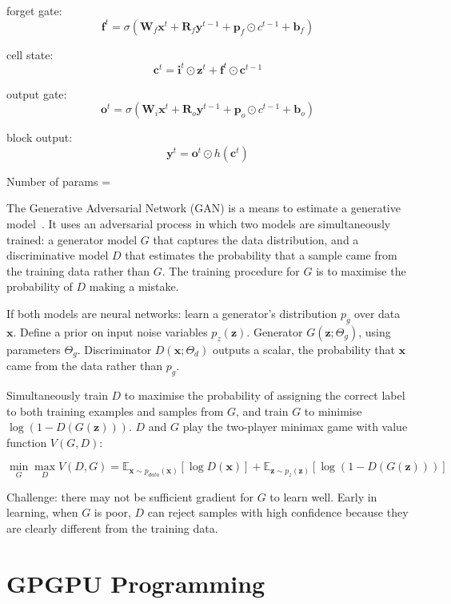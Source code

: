 forget gate:
\[ \bm{f}^{t} = \sigma \left( \bm{W}_f \bm{x}^t + \bm{R}_f \bm{y}^{t-1} + \bm{p}_f \odot c^{t-1} + \bm{b}_f \right) \]

cell state:
\[ \bm{c}^t = \bm{i}^t \odot \bm{z}^t + \bm{f}^t \odot \bm{c}^{t-1} \]

output gate:
\[ \bm{o}^{t} = \sigma \left( \bm{W}_i \bm{x}^t + \bm{R}_o \bm{y}^{t - 1} + \bm{p}_o \odot c^{t-1} + \bm{b}_o \right) \]

block output:
\[ \bm{y}^t = \bm{o}^t \odot h(\bm{c}^t) \]

Number of params = \todo[inline]{\ldots}



The Generative Adversarial Network (GAN) is a means to estimate a generative model~\cite{Goodfellow2014}. It uses an adversarial process in which two models are simultaneously trained: a generator model $G$ that captures the data distribution, and a discriminative model $D$ that estimates the probability that a sample came from the training data rather than $G$. The training procedure for $G$ is to maximise the probability of $D$ making a mistake.

If both models are neural networks: learn a generator's distribution $p_g$ over data $\bm{x}$. Define a prior on input noise variables $p_z(\bm{z})$. Generator $G(\bm{z}; \Theta_g)$, using parameters $\Theta_g$. Discriminator $D(\bm{x}; \Theta_d)$ outputs a scalar, the probability that $\bm{x}$ came from the data rather than $p_g$.

Simultaneously train $D$ to maximise the probability of assigning the correct label to both training examples and samples from $G$, and train $G$ to minimise $\log (1 - D(G(\bm{z})))$. $D$ and $G$ play the two-player minimax game with value function $V(G, D)$:

\[ \min_G \max_D V(D, G) = \mathbb{E}_{\bm{x} \sim  p_{data}(\bm{x})} [ \log D(\bm{x}) ] + \mathbb{E}_{\bm{z} \sim p_z(\bm{z})} [ \log (1 - D(G(\bm{z}))) ] \]

Challenge: there may not be sufficient gradient for $G$ to learn well. Early in learning, when $G$ is poor, $D$ can reject samples with high confidence because they are clearly different from the training data.


\section{GPGPU Programming}
\label{subsec:background-gpgpu}

